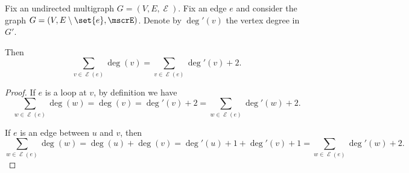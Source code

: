 \begin{lemma}\label{thm:sum_of_endpoint_degrees}
  Fix an undirected multigraph \( G = (V, E, \mscrE) \). Fix an edge \( e \) and consider the graph \( G = (V, E \setminus \set{ e }, \mscrE) \). Denote by \( \deg'(v) \) the vertex degree in \( G' \).

  Then
  \begin{equation}\label{eq:thm:sum_of_endpoint_degrees}
    \sum_{v \in \mscrE(e)} \deg(v) = \sum_{v \in \mscrE(e)} \deg'(v) + 2.
  \end{equation}
\end{lemma}
\begin{proof}
  If \( e \) is a loop at \( v \), by definition we have
  \begin{equation*}
    \sum_{w \in \mscrE(e)} \deg(w) = \deg(v) = \deg'(v) + 2 = \sum_{w \in \mscrE(e)} \deg'(w) + 2.
  \end{equation*}

  If \( e \) is an edge between \( u \) and \( v \), then
  \begin{equation*}
    \sum_{w \in \mscrE(e)} \deg(w)
    =
    \deg(u) + \deg(v)
    =
    \deg'(u) + 1 + \deg'(v) + 1
    =
    \sum_{w \in \mscrE(e)} \deg'(w) + 2.
  \end{equation*}
\end{proof}

